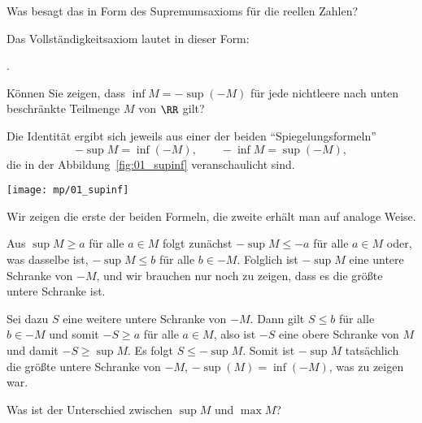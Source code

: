 \begin{frage}
  Was besagt das 
  in Form des Supremumsaxioms
  für die reellen Zahlen?
\end{frage}

\begin{antwort}
  Das Vollständigkeitsaxiom lautet in dieser Form: 

  \medskip\noindent{}.\AntEnd
\end{antwort}


\begin{frage}
  Können Sie zeigen, dass 
  $\inf M=-\sup(-M)$ für jede nichtleere nach unten beschränkte 
  Teilmenge $M$ von $\RR$ gilt? 
\end{frage}

\begin{antwort}
  Die Identität ergibt sich jeweils aus einer 
  der beiden "`Spiegelungsformeln"'   
  \[
  -\sup M =\inf (-M), \qquad
  -\inf M = \sup (-M),  
  \]
  die in der Abbildung~\ref{fig:01_supinf} veranschaulicht sind. 

  \begin{center}
    \texttt{[image: mp/01\_supinf]}
    \label{fig:01_supinf}
  \end{center}

  \noindent
  Wir zeigen die erste der beiden Formeln, die 
  zweite erhält man auf analoge Weise. 

  Aus $\sup M \ge a$ für alle $a\in M$ folgt zunächst 
  $-\sup M \le -a$ für alle $a \in M$ oder, was dasselbe ist,  
  $-\sup M \le b$ für alle $b\in -M$. 
  Folglich ist $-\sup M$ eine untere Schranke von $-M$, und wir 
  brauchen nur noch zu zeigen, dass es die größte untere Schranke ist. 
  
  Sei dazu $S$ eine weitere untere Schranke von $-M$.  
  Dann gilt $S\le b$ für alle $b\in -M$ und somit
  $-S \ge a$ für alle $a\in M$, also ist $-S$ eine obere Schranke von $M$ und 
  damit $-S \ge \sup M$. Es folgt $S \le -\sup M$. Somit ist  
  $-\sup M$ tatsächlich die größte untere Schranke von $-M$, {\dasheisst}    
  $-\sup(M)=\inf (-M)$, was zu zeigen war.
  \AntEnd
\end{antwort}

\begin{frage}
  Was ist der Unterschied zwischen $\sup M$ und $\max M$? 
\end{frage}

